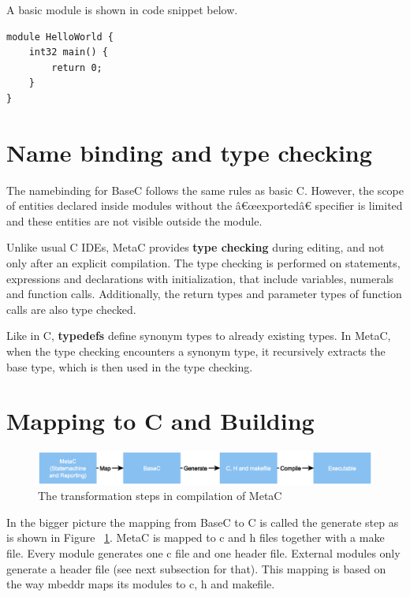 \documentclass[a4paper,10pt,titlepage]{report}
\begin{document}
A basic module is shown in code snippet below.

\begin{lstlisting}
module HelloWorld {
    int32 main() {
        return 0;
    }
}
\end{lstlisting}



\section{Name binding and type checking}
The namebinding for BaseC follows the same rules as basic C. However, the scope of entities declared inside modules without the â€œexportedâ€ specifier is limited and these entities are not visible outside the module.

Unlike usual C IDEs, MetaC provides \textbf{type checking} during editing, and not only after an explicit compilation. The type checking is performed on statements, expressions and declarations with initialization, that include variables, numerals and function calls. Additionally, the return types and parameter types of function calls are also type checked.

Like in C, \textbf{typedefs} define synonym types to already existing types. In MetaC, when the type checking encounters a synonym type, it recursively extracts the base type, which is then used in the type checking.
 

\section{Mapping to C and Building}

\begin{figure}[ht!]
\centering
\includegraphics[width=\linewidth]{pics/compilation_simple.eps}
\caption{The transformation steps in compilation of MetaC}
\label{fig:compilation_simple}
\end{figure}

In the bigger picture the mapping from BaseC to C is called the generate step as is shown in Figure ~\ref{fig:compilation_simple}. MetaC is mapped to c and h files together with a make file. Every module generates one c file and one header file. External modules only generate a header file (see next subsection for that). This mapping is based on the way mbeddr maps its modules to c, h and makefile.
\end{document}
